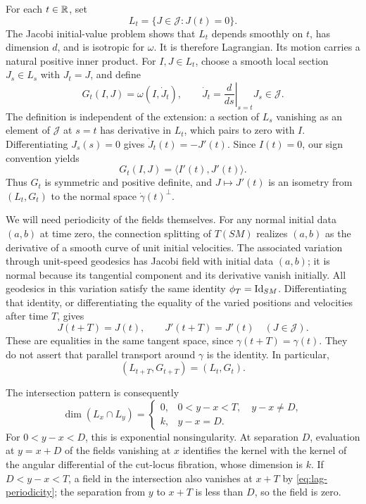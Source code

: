 For each $t\in\mathbb R$, set
\[
 L_t=\{J\in\mathcal J:J(t)=0\}.
\]
The Jacobi initial-value problem shows that $L_t$ depends smoothly on
$t$, has dimension $d$, and is isotropic for $\omega$.  It is therefore
Lagrangian.  Its motion carries a natural positive inner product.
For $I,J\in L_t$, choose a smooth local section $J_s\in L_s$ with
$J_t=J$, and define
\[
 G_t(I,J)=\omega(I,\dot J_t),
 \qquad
 \dot J_t=\left.\frac{d}{ds}\right|_{s=t}J_s\in\mathcal J.
\]
The definition is independent of the extension: a section of $L_s$
vanishing as an element of $\mathcal J$ at $s=t$ has derivative in
$L_t$, which pairs to zero with $I$.  Differentiating $J_s(s)=0$ gives
$\dot J_t(t)=-J'(t)$.  Since $I(t)=0$, our sign convention yields
\begin{equation}
 G_t(I,J)=\langle I'(t),J'(t)\rangle.
 \label{eq:lag-velocity}
\end{equation}
Thus $G_t$ is symmetric and positive definite, and
$J\mapsto J'(t)$ is an isometry from $(L_t,G_t)$ to the normal space
$\dot\gamma(t)^\perp$.

We will need periodicity of the fields themselves.  For any normal
initial data $(a,b)$ at time zero, the connection splitting of
$T(SM)$ realizes $(a,b)$ as the derivative of a smooth curve of unit
initial velocities.  The associated variation through unit-speed
geodesics has Jacobi field with initial data $(a,b)$; it is normal
because its tangential component and its derivative vanish initially.
All geodesics in this variation satisfy the same identity
$\phi_T=\mathrm{Id}_{SM}$.  Differentiating that identity, or differentiating
the equality of the varied positions and velocities after time $T$,
gives
\begin{equation}
 J(t+T)=J(t),\qquad J'(t+T)=J'(t)
 \quad(J\in\mathcal J).
 \label{eq:lag-periodicity}
\end{equation}
These are equalities in the same tangent space, since
$\gamma(t+T)=\gamma(t)$.  They do not assert that parallel transport
around $\gamma$ is the identity.  In particular,
\[
 (L_{t+T},G_{t+T})=(L_t,G_t).
\]

The intersection pattern is consequently
\begin{equation}
 \dim(L_x\cap L_y)=
 \begin{cases}
  0,&0<y-x<T,\quad y-x\ne D,\\
  k,&y-x=D.
 \end{cases}
 \label{eq:lag-intersections}
\end{equation}
For $0<y-x<D$, this is exponential nonsingularity.  At separation
$D$, evaluation at $y=x+D$ of the fields vanishing at $x$ identifies the
kernel with the kernel of the angular differential of the cut-locus
fibration, whose dimension is $k$.  If $D<y-x<T$, a field in the
intersection also vanishes at $x+T$ by
\eqref{eq:lag-periodicity}; the separation from $y$ to $x+T$ is less
than $D$, so the field is zero.

